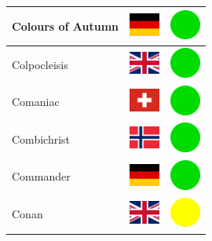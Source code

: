 \documentclass[12pt, a4paper, twoside]{report}
\begin{document}
\begin{center}
\begin{longtable}{|p{5cm}|p{2cm}|p{2cm}|}
 Colours of Autumn                                          & \includegraphics[width=1cm]{../img/flags/de} &   \includegraphics[width=1cm]{../likes/y} \\ \hline
 Colpocleisis                                               & \includegraphics[width=1cm]{../img/flags/gb} &   \includegraphics[width=1cm]{../likes/y} \\ \hline
 Comaniac                                                   & \includegraphics[width=1cm]{../img/flags/ch} &   \includegraphics[width=1cm]{../likes/y} \\ \hline
 Combichrist                                                & \includegraphics[width=1cm]{../img/flags/no} &   \includegraphics[width=1cm]{../likes/y} \\ \hline
 Commander                                                  & \includegraphics[width=1cm]{../img/flags/de} &   \includegraphics[width=1cm]{../likes/y} \\ \hline
 Conan                                                      & \includegraphics[width=1cm]{../img/flags/gb} &   \includegraphics[width=1cm]{../likes/m} \\ \hline

\end{longtable}
\end{center}
\end{document}
